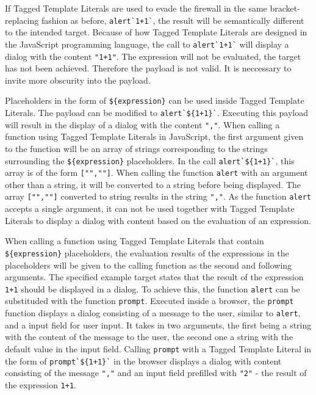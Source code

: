 If Tagged Template Literals are used to evade the firewall in the same bracket-replacing fashion as before, \verb|alert`1+1`|, the result will be semantically different to the intended target.
Because of how Tagged Template Literals are designed in the JavaScript programming language, the call to \verb|alert`1+1`| will display a dialog with the content \verb|"1+1"|. The expression will not be evaluated, the target has not been achieved. Therefore the payload is not valid. It is neccessary to invite more obscurity into the payload. 

Placeholders in the form of \verb|${expression}| can be used inside Tagged Template Literals. The payload can be modified to \verb|alert`${1+1}`|. Executing this payload will result in the display of a dialog with the content \verb|","|. When calling a function using Tagged Template Literals in JavaScript, the first argument given to the function will be an array of strings corresponding to the strings surrounding the \verb|${expression}| placeholders. In the call \verb|alert`${1+1}`|, this array is of the form \verb|["",""]|. When calling the function \verb|alert| with an argument other than a string, it will be converted to a string before being displayed. The array \verb|["",""]| converted to string results in the string \verb|","|. 
As the function \verb|alert| accepts a single argument, it can not be used together with Tagged Template Literals to display a dialog with content based on the evaluation of an expression.

When calling a function using Tagged Template Literals that contain \verb|${expression}| placeholders, the evaluation results of the expressions in the placeholders will be given to the calling function as the second and following arguments.
The specified example target states that the result of the expression \verb|1+1| should be displayed in a dialog.
To achieve this, the function \verb|alert| can be substituded with the function \verb|prompt|. Executed inside a browser, the \verb|prompt| function displays a dialog consisting of a message to the user, similar to \verb|alert|, and a input field for user input. It takes in two arguments, the first being a string with the content of the message to the user, the second one a string with the default value in the input field. 
Calling \verb|prompt| with a Tagged Template Literal in the form of \verb|prompt`${1+1}`| in the browser displays a dialog with content consisting of the message \verb|","| and an input field prefilled with \verb|"2"| - the result of the expression \verb|1+1|.  

